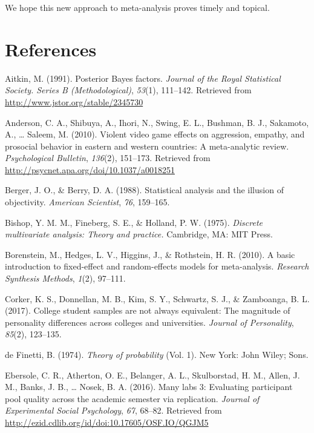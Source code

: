 \documentclass[english,man]{apa6}
\theoremstyle{definition}
\theoremstyle{definition}
\theoremstyle{definition}
\theoremstyle{remark}
\begin{document}
We hope this new approach to meta-analysis proves timely and topical.

\newpage

\section*{References}\label{references}

\hypertarget{refs}{}
\hypertarget{ref-Aitkin:1991}{}
Aitkin, M. (1991). Posterior Bayes factors. \emph{Journal of the Royal
Statistical Society. Series B (Methodological)}, \emph{53}(1), 111--142.
Retrieved from \url{http://www.jstor.org/stable/2345730}

\hypertarget{ref-Anderson:etal:2010}{}
Anderson, C. A., Shibuya, A., Ihori, N., Swing, E. L., Bushman, B. J.,
Sakamoto, A., \ldots{} Saleem, M. (2010). Violent video game effects on
aggression, empathy, and prosocial behavior in eastern and western
countries: A meta-analytic review. \emph{Psychological Bulletin},
\emph{136}(2), 151--173. Retrieved from
\url{http://psycnet.apa.org/doi/10.1037/a0018251}

\hypertarget{ref-Berger:Berry:1988}{}
Berger, J. O., \& Berry, D. A. (1988). Statistical analysis and the
illusion of objectivity. \emph{American Scientist}, \emph{76}, 159--165.

\hypertarget{ref-Bishop:etal:1975}{}
Bishop, Y. M. M., Fineberg, S. E., \& Holland, P. W. (1975).
\emph{Discrete multivariate analysis: Theory and practice.} Cambridge,
MA: MIT Press.

\hypertarget{ref-Borenstein:etal:2010}{}
Borenstein, M., Hedges, L. V., Higgins, J., \& Rothstein, H. R. (2010).
A basic introduction to fixed-effect and random-effects models for
meta-analysis. \emph{Research Synthesis Methods}, \emph{1}(2), 97--111.

\hypertarget{ref-Corker:etal:2017}{}
Corker, K. S., Donnellan, M. B., Kim, S. Y., Schwartz, S. J., \&
Zamboanga, B. L. (2017). College student samples are not always
equivalent: The magnitude of personality differences across colleges and
universities. \emph{Journal of Personality}, \emph{85}(2), 123--135.

\hypertarget{ref-deFinetti:1974}{}
de Finetti, B. (1974). \emph{Theory of probability} (Vol. 1). New York:
John Wiley; Sons.

\hypertarget{ref-Ebersole:etal:2016}{}
Ebersole, C. R., Atherton, O. E., Belanger, A. L., Skulborstad, H. M.,
Allen, J. M., Banks, J. B., \ldots{} Nosek, B. A. (2016). Many labs 3:
Evaluating participant pool quality across the academic semester via
replication. \emph{Journal of Experimental Social Psychology},
\emph{67}, 68--82. Retrieved from
\url{http://ezid.cdlib.org/id/doi:10.17605/OSF.IO/QGJM5}
\end{document}
